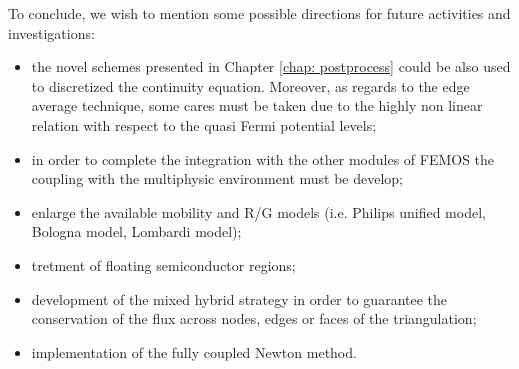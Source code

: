 To conclude, we wish to mention some possible directions for future activities and investigations:
\begin{itemize}
\item the novel schemes presented in Chapter \ref{chap: postprocess} could be also used to discretized the continuity equation. Moreover, as regards to the edge average technique, some cares must be taken due to the highly non linear relation with respect to the quasi Fermi potential levels;

\item in order to complete the integration with the other modules of FEMOS the coupling with the multiphysic environment must be develop;

\item enlarge the available mobility and R/G models (i.e. Philips unified model, Bologna model, Lombardi model);

\item tretment of floating semiconductor regions;

\item development of the mixed hybrid strategy in order to guarantee the conservation of the flux across nodes, edges or faces of the triangulation;

\item implementation of the fully coupled Newton method.
\end{itemize}